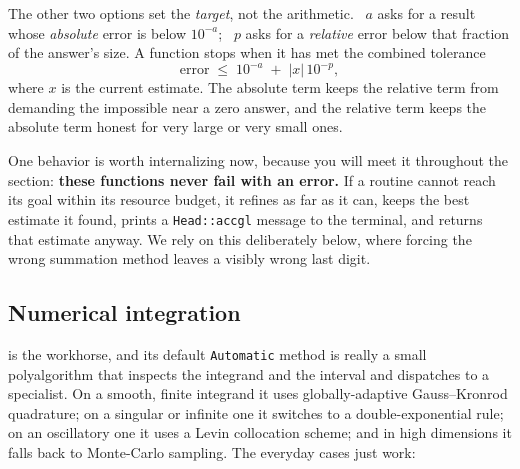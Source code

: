 The other two options set the \emph{target}, not the arithmetic. ~\(a\) asks for a
result whose \emph{absolute} error is below \(10^{-a}\); ~\(p\) asks for a
\emph{relative} error below that fraction of the answer's size. A function stops when it has met the
combined tolerance
\[
  \text{error} \;\le\; 10^{-a} \;+\; |x|\,10^{-p},
\]
where \(x\) is the current estimate.
The absolute term keeps the relative term from demanding the impossible near a zero answer, and the
relative term keeps the absolute term honest for very large or very small ones.

One behavior is worth internalizing now, because you will meet it throughout the section:
\textbf{these functions never fail with an error.} If a routine cannot reach its goal within its
resource budget, it refines as far as it can, keeps the best estimate it found, prints a
\texttt{Head::accgl} message to the terminal, and returns that estimate
anyway. We rely on this deliberately below, where forcing the wrong summation method leaves a
visibly wrong last digit.

\subsection{Numerical integration}
\label{ssec:nintegrate}

 is the workhorse, and its default
\texttt{Automatic} method is really a small polyalgorithm that inspects the integrand and the
interval and dispatches to a specialist. On a smooth, finite integrand it uses globally-adaptive
Gauss--Kronrod quadrature; on a singular or infinite one it switches to a double-exponential rule;
on an oscillatory one it uses a Levin collocation scheme; and in high dimensions it falls back to
Monte-Carlo sampling. The everyday cases just work:

